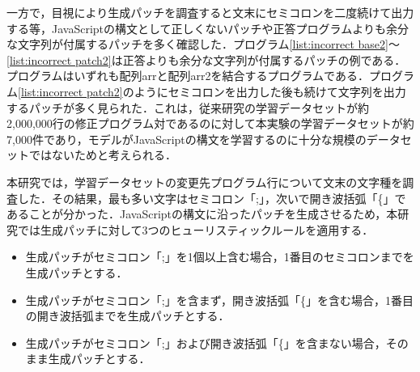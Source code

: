 \documentclass[submit,ses,noauthor]{ipsj}
\begin{document}
一方で，目視により生成パッチを調査すると文末にセミコロンを二度続けて出力する等，JavaScriptの構文として正しくないパッチや正答プログラムよりも余分な文字列が付属するパッチを多く確認した．プログラム\ref{list:incorrect base2}〜\ref{list:incorrect patch2}は正答よりも余分な文字列が付属するパッチの例である．プログラムはいずれも配列arrと配列arr2を結合するプログラムである．プログラム\ref{list:incorrect patch2}のようにセミコロンを出力した後も続けて文字列を出力するパッチが多く見られた．これは，従来研究の学習データセットが約2,000,000行の修正プログラム対であるのに対して本実験の学習データセットが約7,000件であり，モデルがJavaScriptの構文を学習するのに十分な規模のデータセットではないためと考えられる．

本研究では，学習データセットの変更先プログラム行について文末の文字種を調査した．その結果，最も多い文字はセミコロン「;」，次いで開き波括弧「\{」であることが分かった．JavaScriptの構文に沿ったパッチを生成させるため，本研究では生成パッチに対して3つのヒューリスティックルールを適用する．

\begin{itemize}
  \item 生成パッチがセミコロン「;」を1個以上含む場合，1番目のセミコロンまでを生成パッチとする．
  \item 生成パッチがセミコロン「;」を含まず，開き波括弧「\{」を含む場合，1番目の開き波括弧までを生成パッチとする．
  \item 生成パッチがセミコロン「;」および開き波括弧「\{」を含まない場合，そのまま生成パッチとする．
\end{itemize}


\end{document}
